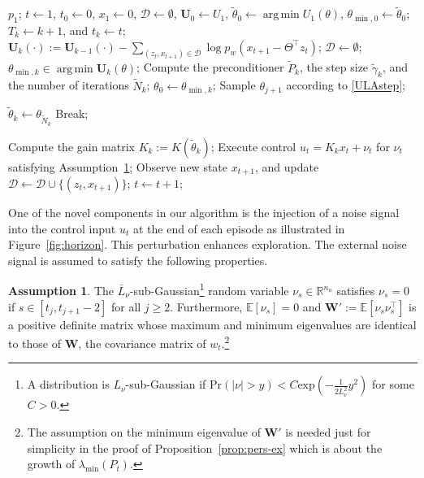\documentclass[11pt]{article}
\theoremstyle{plain}
\theoremstyle{definition}
\newtheorem{assumption}[thm]{Assumption}
\theoremstyle{remark}
\DeclareMathOperator*{\argmin}{arg\,min}
\begin{document}
\begin{algorithm}[h]
\caption{Thompson sampling with Langevin dynamics for LQR
}
\label{alg:ula}
\begin{algorithmic}[1]
 $p_1$;
 $t \leftarrow 1$, $t_0 \leftarrow 0$,
$x_1 \leftarrow 0$, $\mathcal{D} \leftarrow \emptyset$,
$\mathbf{U}_0 \leftarrow U_1$,
$\tilde{{\theta}}_0 \leftarrow \argmin U_1 (\theta)$, $\theta_{\min, 0} \leftarrow \tilde{\theta}_0$;
\State $T_{k} \leftarrow k+1$, and $t_k \leftarrow t$;
\State $\mathbf{U}_k (\cdot) := \mathbf{U}_{k-1} (\cdot) -\sum_{(z_t, x_{t+1}) \in \mathcal{D}} \log p_w(x_{t+1} -\Theta^\top z_t)$;
\State $\mathcal{D} \leftarrow \emptyset$;
\State $\theta_{\min, k} \in \argmin \mathbf{U}_k (\theta)$;
\State Compute the preconditioner $\tilde{P}_k$, the step  size $\tilde{\gamma}_k$, and the number of iterations $\tilde{N}_k$;
\State ${\theta}_0 \leftarrow \theta_{\min, k}$;
\State Sample ${\theta}_{j+1}$ according to \eqref{ULAstep};
\EndFor

\State $\tilde\theta_k\leftarrow\theta_{\tilde{N}_k}$
\State Break;
\EndIf

\EndWhile
\State Compute the gain matrix $K_k := K(\tilde{\theta}_k)$;
\State Execute control $u_t = K_k x_t + \nu_t$ for $\nu_t$ satisfying Assumption~\ref{ass:perturb};
\State Observe new state $x_{t+1}$, and update $\mathcal{D} \leftarrow \mathcal{D} \cup \{(z_t, x_{t+1})\}$;
\State  $t \leftarrow t+1$;
\EndWhile
\EndFor
\end{algorithmic}
\end{algorithm}


One of the novel components in our algorithm is the injection of a noise signal into the control input $u_t$ at the end of each episode as illustrated in Figure~\ref{fig:horizon}. 
This perturbation enhances exploration.
The external noise signal is assumed to satisfy the following properties.

\begin{assumption}\label{ass:perturb}
The  $\bar L_\nu$-sub-Gaussian\footnote{A distribution is $L_\nu$-sub-Gaussian if $\mathrm{Pr}(|\nu| > y )< C  \text{exp}(-\frac{1}{2L_{\nu}^2} y^2)$ for some $C>0$.} random variable $\nu_{s} \in \mathbb{R}^{n_u}$ satisfies $\nu_s=0$ if $s\in [t_j,t_{j+1}-2]$ for all $j\geq 2$. Furthermore, $\mathbb{E}[\nu_s]=0$ and $\mathbf{W}':=\mathbb{E}[\nu_s \nu_s^{\top}]$ is a positive definite matrix whose maximum and minimum eigenvalues are identical to those of $\mathbf{W}$, the covariance matrix of $w_t$.\footnote{The assumption on the minimum eigenvalue of $\mathbf{W'}$ is needed just for simplicity in the proof of Proposition~\ref{prop:pers-ex} which is about the growth of $\lambda_{\min}(P_t)$.} 
\end{assumption}
\end{document}
